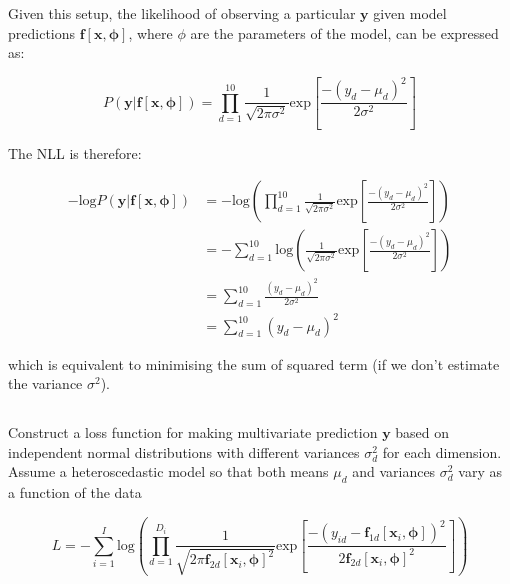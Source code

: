 \documentclass[12pt]{report}
\begin{document}
Given this setup, the likelihood of observing a particular $\mathbf{y}$ given model predictions $\mathbf{f}[\mathbf{x},\boldsymbol{\phi}]$, where $\phi$ are the parameters of the model, can be expressed as:

\begin{equation*}
    P(\mathbf{y}|\mathbf{f}[\mathbf{x},\boldsymbol{\phi}]) =\prod_{d=1}^{10}\frac{1}{\sqrt{2\pi\sigma^{2}}}\text{exp}\left[\frac{-(y_{d}-\mu_{d})^{2}}{2\sigma^{2}}\right]
\end{equation*}

The NLL is therefore:

\begin{align*}
    -\text{log}P(\mathbf{y}|\mathbf{f}[\mathbf{x},\boldsymbol{\phi}]) & = -\text{log}\left(\prod_{d=1}^{10}\frac{1}{\sqrt{2\pi\sigma^{2}}}\text{exp}\left[\frac{-(y_{d}-\mu_{d})^{2}}{2\sigma^{2}}\right]\right) \\
                                                                      & = -\sum_{d=1}^{10}\text{log}\left(\frac{1}{\sqrt{2\pi\sigma^{2}}}\text{exp}\left[\frac{-(y_{d}-\mu_{d})^{2}}{2\sigma^{2}}\right]\right)  \\
                                                                      & = \sum_{d=1}^{10}\frac{(y_{d}-\mu_{d})^{2}}{2\sigma^{2}}                                                                                 \\
                                                                      & = \sum_{d=1}^{10}(y_{d}-\mu_{d})^{2}
\end{align*}

which is equivalent to minimising the sum of squared term (if we don't estimate the variance $\sigma^{2}$).

\subsection{}
\begin{mdframed}
    Construct a loss function for making multivariate prediction $\mathbf{y}$ based on independent normal distributions with different variances $\sigma^{2}_{d}$ for each dimension. Assume a heteroscedastic model so that both means $\mu_{d}$ and variances $\sigma^{2}_{d}$ vary as a function of the data
\end{mdframed}

\begin{equation*}
    L = -\sum_{i=1}^{I}\text{log}\left(\prod_{d=1}^{D_{i}}\frac{1}{\sqrt{2\pi\mathbf{f}_{2d}[\mathbf{x}_{i},\boldsymbol{\phi}]^{2}}}\text{exp}\left[\frac{-(y_{id}-\mathbf{f}_{1d}[\mathbf{x}_{i},\boldsymbol{\phi}])^{2}}{2\mathbf{f}_{2d}[\mathbf{x}_{i},\boldsymbol{\phi}]^{2}}\right]\right)
\end{equation*}
\end{document}
